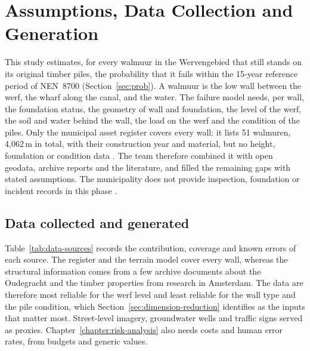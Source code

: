 \clearpage
\section{Assumptions, Data Collection and Generation}
\label{sec:assumptions}\label{sec:data}


This study estimates, for every walmuur in the Wervengebied that still stands
on its original timber piles, the probability that it fails within the
15-year reference period of NEN~8700 (Section~\ref{sec:prob}). A walmuur is
the low wall between the werf, the wharf along the canal, and the water. The
failure model needs, per wall, the foundation status, the geometry of wall and
foundation, the level of the werf, the soil and water behind the wall, the
load on the werf and the condition of the piles. Only the municipal asset
register covers every wall: it lists 51 walmuren, 4{,}062\,m in total, with
their construction year and material, but no height, foundation or condition
data \parencite{gu2025register}. The team therefore combined it with open
geodata, archive reports and the literature, and filled the remaining gaps
with stated assumptions. The municipality does not provide inspection,
foundation or incident records in this phase \parencite{utrecht_qa2026}.

\subsection{Data collected and generated}\label{sec:data-collected}\label{sec:data-generated}

Table~\ref{tab:data-sources} records the contribution, coverage and known
errors of each source. The register and the terrain model cover every wall,
whereas the structural information comes from a few archive documents about
the Oudegracht and the timber properties from research in Amsterdam. The data
are therefore most reliable for the werf level and least reliable for the
wall type and the pile condition, which Section~\ref{sec:dimension-reduction}
identifies as the inputs that matter most. Street-level imagery, groundwater
wells and traffic signs served as proxies. Chapter~\ref{chapter:risk-analysis}
also needs costs and human error rates, from budgets and generic values.


